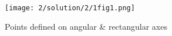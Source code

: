 \begin{figure}[!ht]
	\centering
	\texttt{[image: 2/solution/2/1fig1.png]}
	\caption{Points defined on angular \& rectangular axes}
    \label{2/solution/2/1Fig1: Points plotted in Python}

	\end{figure}
	
